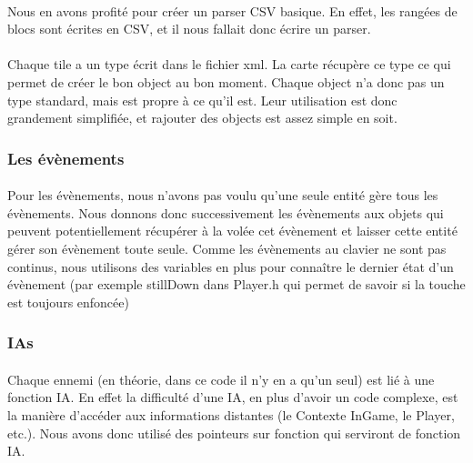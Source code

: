 \paragraph{} Nous en avons profité pour créer un parser CSV basique. En effet, les rangées de blocs sont écrites en CSV, et il nous fallait donc écrire un parser.
\paragraph{} Chaque tile a un type écrit dans le fichier xml. La carte récupère ce type ce qui permet de créer le bon object au bon moment. Chaque object n'a donc pas un type standard, mais est propre à ce qu'il est. Leur utilisation est donc grandement simplifiée, et rajouter des objects est assez simple en soit.

\subsubsection{Les évènements}

\paragraph{} Pour les évènements, nous n'avons pas voulu qu'une seule entité gère tous les évènements. Nous donnons donc successivement les évènements aux objets qui peuvent potentiellement récupérer à la volée cet évènement et laisser cette entité gérer son évènement toute seule. Comme les évènements au clavier ne sont pas continus, nous utilisons des variables en plus pour connaître le dernier état d'un évènement (par exemple stillDown dans Player.h qui permet de savoir si la touche est toujours enfoncée)

\subsubsection{IAs}

\paragraph{} Chaque ennemi (en théorie, dans ce code il n'y en a qu'un seul) est lié à une fonction IA. En effet la difficulté d'une IA, en plus d'avoir un code complexe, est la manière d'accéder aux informations distantes (le Contexte InGame, le Player, etc.). Nous avons donc utilisé des pointeurs sur fonction qui serviront de fonction IA.
